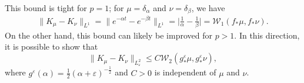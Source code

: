\documentclass{cams-l} %
\theoremstyle{definition}
\theoremstyle{remark}
\numberwithin{equation}{section}
\begin{document}
This bound is tight for $p = 1$; for $\mu = \delta_\alpha$ and $\nu = \delta_\beta$, we have
\begin{align*}
    \|K_\mu - K_\nu\|_{L^1} = \|e^{-\alpha t} - e^{-\beta t}\|_{L^1} = \Big|\frac{1}{\alpha} - \frac{1}{\beta}\Big| = \mathcal{W}_1(f_*\mu, f_*\nu).
\end{align*}
On the other hand, this bound can likely be improved for $p > 1$. In this direction, it is possible to show that
\begin{equation}\label{eq:wasserstein_L2}
    \|K_\mu - K_\nu\|_{L_\varepsilon^2} \leq C\mathcal{W}_2(g^\varepsilon_{*}\mu, g^\varepsilon_{*}\nu),
\end{equation}
where $g^\varepsilon(\alpha) = \tfrac{1}{2}(\alpha + \varepsilon)^{-\frac{1}{2}}$ and $C>0$ is independent of $\mu$ and $\nu$.
\end{document}
